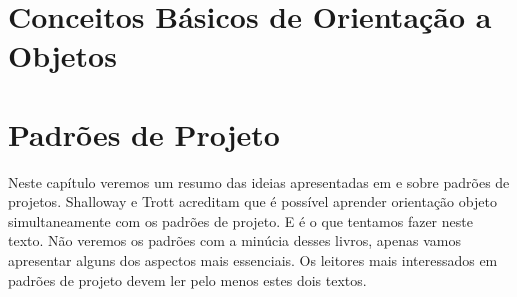 \documentclass[
	11pt,				%
	openright,
	twoside,			%
	a4paper,			%
	english,			%
	french,
	brazil,				%
	sumario=tradicional
	]{abntex2}
\begin{document}

\frenchspacing 


\imprimircapa

\listoffigures*
\cleardoublepage*

\listoftables*
\cleardoublepage*

\tableofcontents*
\cleardoublepage*

%

\textual


\chapter{Conceitos Básicos de Orientação a Objetos}



\chapter{Padrões de Projeto}

Neste capítulo veremos um resumo das ideias apresentadas em \cite{DP:explained} e \cite{design:patterns} sobre padrões de projetos. Shalloway e Trott acreditam que é possível aprender orientação objeto simultaneamente com os padrões de projeto. E é o que tentamos fazer neste texto. Não veremos os padrões com a minúcia desses livros, apenas vamos apresentar alguns dos aspectos mais essenciais. Os leitores mais interessados em padrões de projeto devem ler pelo menos estes dois textos.
\end{document}
